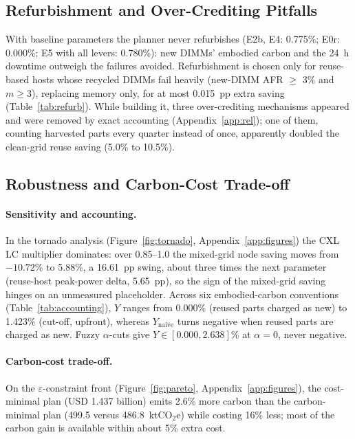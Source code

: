 \documentclass{article} %
\begin{document}
\subsection{Refurbishment and Over-Crediting Pitfalls}
\label{sec:refurb}
With baseline parameters the planner never refurbishes (E2b, E4: 0.775\%; E0r: 0.000\%; E5 with all levers: 0.780\%): new DIMMs' embodied carbon and the 24~h downtime outweigh the failures avoided. Refurbishment is chosen only for reuse-based hosts whose recycled DIMMs fail heavily (new-DIMM AFR $\ge$ 3\% and $m\ge 3$), replacing memory only, for at most 0.015~pp extra saving (Table~\ref{tab:refurb}). While building it, three over-crediting mechanisms appeared and were removed by exact accounting (Appendix~\ref{app:rel}); one of them, counting harvested parts every quarter instead of once, apparently doubled the clean-grid reuse saving (5.0\% to 10.5\%).

\subsection{Robustness and Carbon-Cost Trade-off}
\label{sec:robustness}
\paragraph{Sensitivity and accounting.} In the tornado analysis (Figure~\ref{fig:tornado}, Appendix~\ref{app:figures}) the CXL LC multiplier dominates: over 0.85--1.0 the mixed-grid node saving moves from $-10.72\%$ to 5.88\%, a 16.61~pp swing, about three times the next parameter (reuse-host peak-power delta, 5.65~pp), so the sign of the mixed-grid saving hinges on an unmeasured placeholder. Across six embodied-carbon conventions (Table~\ref{tab:accounting}), $Y$ ranges from 0.000\% (reused parts charged as new) to 1.423\% (cut-off, upfront), whereas $Y_{\text{naive}}$ turns negative when reused parts are charged as new. Fuzzy $\alpha$-cuts give $Y\in[0.000, 2.638]\%$ at $\alpha=0$, never negative.

\paragraph{Carbon-cost trade-off.} On the $\varepsilon$-constraint front (Figure~\ref{fig:pareto}, Appendix~\ref{app:figures}), the cost-minimal plan (USD 1.437 billion) emits 2.6\% more carbon than the carbon-minimal plan (499.5 versus 486.8~ktCO$_2$e) while costing 16\% less; most of the carbon gain is available within about 5\% extra cost.
\end{document}
